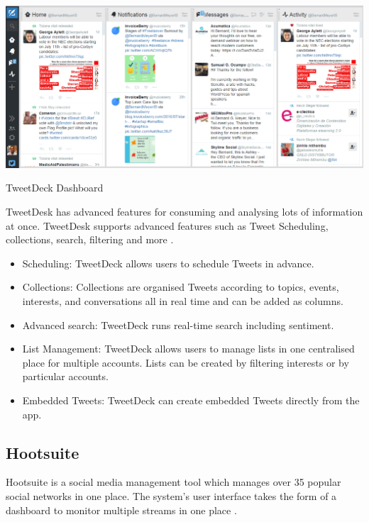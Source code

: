 \documentclass[chapterprefix=false]{scrreprt}
\begin{document}
\begin{center}
 \includegraphics[scale=0.3]{tweetdeck-screenshot}
 \newline
 \caption{TweetDeck Dashboard \cite{tweetdeck-dashboard}}
\end{center}

TweetDesk has advanced features for consuming and analysing lots of information at once. TweetDesk supports advanced features such as Tweet Scheduling, collections, search, filtering and more \cite{tweetdeck-features}. 

\begin{itemize}
 \setlength\itemsep{-0.75em}
 \item Scheduling: TweetDeck allows users to schedule Tweets in advance.
 \item Collections: Collections are organised Tweets according to topics, events, interests,  and conversations all in real time and can be added as columns.
 \item Advanced search: TweetDeck runs real-time search including sentiment.
 \item List Management: TweetDeck allows users to manage lists in one centralised place for multiple accounts. Lists can be created by filtering interests or by particular accounts.
 \item Embedded Tweets: TweetDeck can create embedded Tweets directly from the app.
\end{itemize}

\subsection{Hootsuite}

Hootsuite is a social media management tool which manages over 35 popular social networks in one place. The system's user interface takes the form of a dashboard to monitor multiple streams in one place \cite{inc._2019}.
\end{document}
